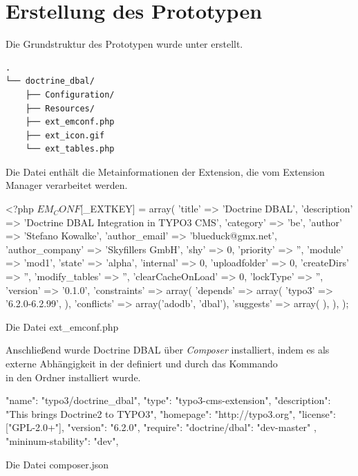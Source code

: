 \section{Erstellung des Prototypen}
\label{prototype:sec:createPrototype}
Die Grundstruktur des Prototypen wurde unter  erstellt.

\begin{Verbatim}[samepage=true]
.
└── doctrine_dbal/
    ├── Configuration/
    ├── Resources/
    ├── ext_emconf.php
    ├── ext_icon.gif
    └── ext_tables.php
\end{Verbatim}

Die Datei  enthält die Metainformationen der Extension, die vom Extension Manager verarbeitet werden.

\begin{listing}
\begin{phpcode}
<?php
$EM_CONF[$_EXTKEY] = array(
	'title' => 'Doctrine DBAL',
	'description' => 'Doctrine DBAL Integration in TYPO3 CMS',
	'category' => 'be',
	'author' => 'Stefano Kowalke',
	'author_email' => 'blueduck@gmx.net',
	'author_company' => 'Skyfillers GmbH',
	'shy' => 0,
	'priority' => '',
	'module' => 'mod1',
	'state' => 'alpha',
	'internal' => 0,
	'uploadfolder' => 0,
	'createDirs' => '',
	'modify_tables' => '',
	'clearCacheOnLoad' => 0,
	'lockType' => '',
	'version' => '0.1.0',
	'constraints' => array(
		'depends' => array(
			'typo3' => '6.2.0-6.2.99',
		),
		'conflicts' => array('adodb', 'dbal'),
		'suggests' => array(
		),
	),
);
\end{phpcode}
\caption{Die Datei ext\_emconf.php}
\label{lst:extEmconf}
\end{listing}

Anschließend wurde Doctrine DBAL über \textit{Composer} installiert, indem es als externe Abhängigkeit in der  definiert und durch das Kommando\\  in den Ordner  installiert wurde.

\begin{listing}[H]
\begin{jsoncode}
{
	"name": "typo3/doctrine_dbal",
	"type": "typo3-cms-extension",
	"description": "This brings Doctrine2 to TYPO3",
	"homepage": "http://typo3.org",
	"license": ["GPL-2.0+"],
	"version": "6.2.0",
	"require": {
		"doctrine/dbal": "dev-master"
	},
	"mininum-stability": "dev",
}
\end{jsoncode}
\caption{Die Datei composer.json}
\label{lst:composer}
\end{listing}


